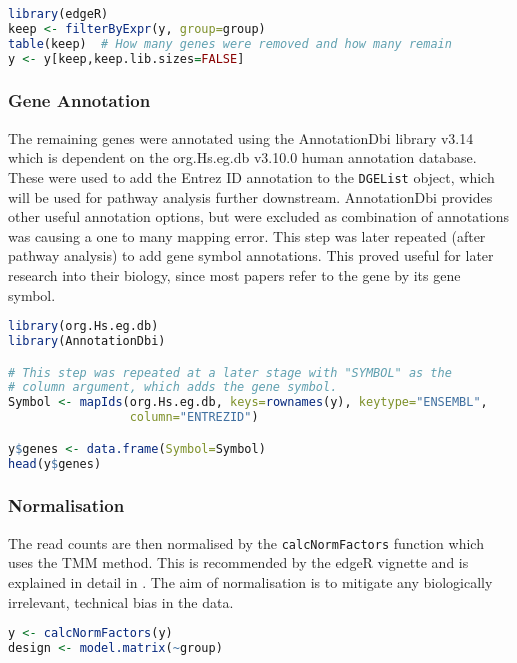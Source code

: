 \begin{lstlisting}[language=R, caption=Filtering low count genes]
library(edgeR)
keep <- filterByExpr(y, group=group)
table(keep)  # How many genes were removed and how many remain
y <- y[keep,keep.lib.sizes=FALSE]
\end{lstlisting}

\subsubsection{Gene Annotation}

The remaining genes were annotated using the AnnotationDbi library v3.14 \citep{annotationdbi} which is dependent on the org.Hs.eg.db v3.10.0 \citep{org.Hs.eg.db} human annotation database. These were used to add the Entrez ID annotation to the \texttt{DGEList} object, which will be used for pathway analysis further downstream. AnnotationDbi provides other useful annotation options, but were excluded as combination of annotations was causing a one to many mapping error. This step was later repeated (after pathway analysis) to add gene symbol annotations. This proved useful for later research into their biology, since most papers refer to the gene by its gene symbol.

\begin{lstlisting}[language=R, caption=Annotation step]
library(org.Hs.eg.db)
library(AnnotationDbi) 

# This step was repeated at a later stage with "SYMBOL" as the
# column argument, which adds the gene symbol.
Symbol <- mapIds(org.Hs.eg.db, keys=rownames(y), keytype="ENSEMBL",
                 column="ENTREZID")

y$genes <- data.frame(Symbol=Symbol)
head(y$genes)
\end{lstlisting}

\subsubsection{Normalisation}

The read counts are then normalised by the \texttt{calcNormFactors} function which uses the \ac{TMM} method. This is recommended by the edgeR vignette and is explained in detail in \cite{robinson2010scaling}. The aim of normalisation is to mitigate any biologically irrelevant, technical bias in the data.

\begin{lstlisting}[language=R, caption=TMM normalisation]
y <- calcNormFactors(y)
design <- model.matrix(~group)
\end{lstlisting}

